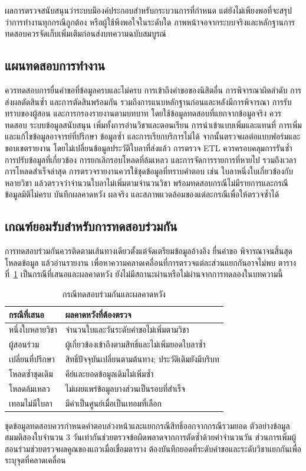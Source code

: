 ผลการตรวจสนับสนุนว่าระบบมีองค์ประกอบสำหรับกระบวนการที่กำหนด แต่ยังไม่เพียงพอที่จะสรุปว่าการทำงานทุกกรณีถูกต้อง หรือผู้ใช้พึงพอใจในระดับใด ภาพหน้าจอจากระบบจริงและหลักฐานการทดสอบควรจัดเก็บเพิ่มเติมก่อนส่งบทความฉบับสมบูรณ์
\subsection{แผนทดสอบการทำงาน}
ควรทดสอบการยื่นคำขอที่ข้อมูลครบและไม่ครบ การเข้าถึงคำขอของนิสิตอื่น การพิจารณาผิดลำดับ การส่งผลตัดสินซ้ำ และการตัดสินพร้อมกัน รวมถึงการแนบหลักฐานก่อนและหลังมีการพิจารณา การรับทราบของผู้สอน และการกรองรายงานตามบทบาท โดยใช้ข้อมูลทดสอบที่แยกจากข้อมูลจริง
ควรทดสอบ ระบบข้อมูลสนับสนุน เพิ่มทั้งการอ่านวิชาและตอนเรียน การนำเข้าแบบเพิ่มและแทนที่ การเพิ่มและแก้ไขข้อมูลอาจารย์ที่ปรึกษา ข้อมูลซ้ำ และการเรียกบริการไม่ได้ จากนั้นตรวจผลต่อแบบฟอร์มและขอบเขตรายงาน โดยไม่เปลี่ยนข้อมูลประวัติใบลาที่ส่งแล้ว การตรวจ ETL ควรครอบคลุมการรันซ้ำ การปรับข้อมูลที่เกี่ยวข้อง การยกเลิกรอบโหลดที่ล้มเหลว และการจัดการรายการที่หายไป รวมถึงเวลาการโหลดสำเร็จล่าสุด
การตรวจรายงานควรใช้ชุดข้อมูลที่ทราบคำตอบ เช่น ใบลาหนึ่งใบเกี่ยวข้องกับหลายวิชา แล้วตรวจว่าจำนวนใบลาไม่เพิ่มตามจำนวนวิชา พร้อมทดสอบกรณีไม่มีรายการและกรณีข้อมูลมิติไม่ครบ บันทึกผลคาดหวัง ผลจริง และสภาพแวดล้อมของแต่ละกรณีเพื่อให้ตรวจซ้ำได้
\subsection{เกณฑ์ยอมรับสำหรับการทดสอบร่วมกัน}
การทดสอบร่วมกันควรติดตามเส้นทางเดียวตั้งแต่จัดเตรียมข้อมูลอ้างอิง ยื่นคำขอ พิจารณาจนสิ้นสุด โหลดข้อมูล แล้วอ่านรายงาน เพื่อหาความคลาดเคลื่อนที่การตรวจแต่ละส่วนแยกกันอาจไม่พบ ตารางที่~\ref{tab:acceptance} เป็นกรณีที่เสนอและผลคาดหวัง ยังไม่มีสถานะผ่านหรือไม่ผ่านจากการทดลองในบทความนี้
\begin{table}[H]
\caption{กรณีทดสอบร่วมกันและผลคาดหวัง}\label{tab:acceptance}
\centering
\begin{tabularx}{\columnwidth}{|p{25mm}|X|}
\hline
กรณีที่เสนอ & ผลคาดหวังที่ต้องตรวจ \\ \hline
หนึ่งใบหลายวิชา & จำนวนใบและวันระดับคำขอไม่เพิ่มตามวิชา \\ \hline
ผู้สอนร่วม & ผู้เกี่ยวข้องเข้าถึงตามสิทธิ์และไม่เพิ่มยอดใบลาซ้ำ \\ \hline
เปลี่ยนที่ปรึกษา & สิทธิ์ปัจจุบันเปลี่ยนตามต้นทาง; ประวัติเดิมยังมีบริบท \\ \hline
โหลดซ้ำชุดเดิม & คีย์และยอดข้อมูลเดิมไม่เพิ่มซ้ำ \\ \hline
โหลดล้มเหลว & ไม่เผยแพร่ข้อมูลบางส่วนเป็นรอบที่สำเร็จ \\ \hline
เทอมไม่มีใบลา & มีค่าเป็นศูนย์เมื่อเป็นเทอมที่เลือก \\ \hline
\end{tabularx}
\end{table}
ชุดข้อมูลทดสอบควรกำหนดคำตอบล่วงหน้าและแยกกรณีสิทธิ์ออกจากกรณีรวมยอด ตัวอย่างข้อมูลสมมติสองใบจำนวน 3 วันเท่ากันช่วยตรวจข้อผิดพลาดจากการตัดซ้ำด้วยค่าจำนวนวัน ส่วนการเพิ่มผู้สอนร่วมช่วยตรวจผลคูณของแถวเมื่อเชื่อมตาราง ต้องบันทึกยอดที่ระดับคำขอและระดับวิชาแยกกันเพื่อระบุจุดที่คลาดเคลื่อน
